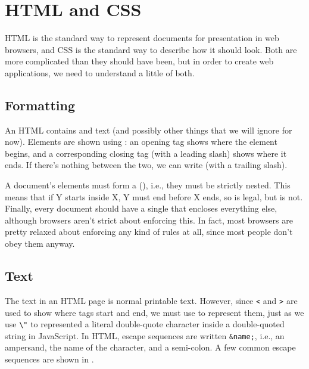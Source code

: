 \chapter{HTML and CSS}\label{s:htmlcss}

HTML is the standard way to represent documents for presentation in web browsers,
and CSS is the standard way to describe how it should look.
Both are more complicated than they should have been,
but in order to create web applications,
we need to understand a little of both.

\section{Formatting}\label{s:htmlcss-formatting}

An HTML  contains  and text
(and possibly other things that we will ignore for now).
Elements are shown using :
an opening tag \texttt{} shows where the element begins,
and a corresponding closing tag \texttt{} (with a leading slash) shows where it ends.
If there's nothing between the two, we can write \texttt{} (with a trailing slash).

A document's elements must form a  (),
i.e.,
they must be strictly nested.
This means that if Y starts inside X,
Y must end before X ends,
so \texttt{} is legal,
but \texttt{} is not.
Finally,
every document should have a single  that encloses everything else,
although browsers aren't strict about enforcing this.
In fact,
most browsers are pretty relaxed about enforcing any kind of rules at all,
since most people don't obey them anyway.

\section{Text}\label{s:htmlcss-text}

The text in an HTML page is normal printable text.
However,
since \texttt{{\textless}} and \texttt{{\textgreater}} are used to show where tags start and end,
we must use  to represent them,
just as we use \texttt{\textbackslash{}"} to represented a literal double-quote character
inside a double-quoted string in JavaScript.
In HTML,
escape sequences are written \texttt{\&name;},
i.e.,
an ampersand, the name of the character, and a semi-colon.
A few common escape sequences are shown in .

